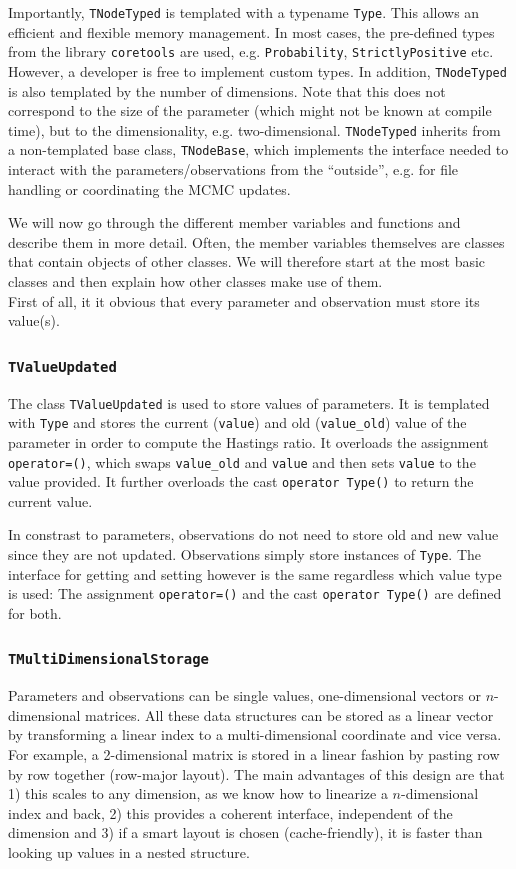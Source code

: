\documentclass[a4paper,11pt]{article}
\def\coretools{\texttt{coretools}}
\newcommand{\class}[1]{\texttt{#1}}
\newcommand{\privparam}[1]{\texttt{\textunderscore #1}}
\newcommand{\pubfunc}[1]{\texttt{#1()}}
\newcommand{\type}[1]{\texttt{#1}}
\begin{document}
Importantly, \class{TNodeTyped} is templated with a typename \type{Type}. This allows an efficient and flexible memory management. In most cases, the pre-defined types from the library \coretools{} are used, e.g. \type{Probability}, \type{StrictlyPositive} etc. However, a developer is free to implement custom types. In addition, \class{TNodeTyped} is also templated by the number of dimensions. Note that this does not correspond to the size of the parameter (which might not be known at compile time), but to the dimensionality, e.g. two-dimensional. \class{TNodeTyped} inherits from a non-templated base class, \class{TNodeBase}, which implements the interface needed to interact with the parameters/observations from the ``outside'', e.g. for file handling or coordinating the MCMC updates.

We will now go through the different member variables and functions and describe them in more detail. Often, the member variables themselves are classes that contain objects of other classes. We will therefore start at the most basic classes and then explain how other classes make use of them.\\
First of all, it it obvious that every parameter and observation must store its value(s).

\subsubsection{\class{TValueUpdated}}
The class \class{TValueUpdated} is used to store values of parameters. It is templated with \type{Type} and stores the current (\privparam{value}) and old (\privparam{value\_old}) value of the parameter in order to compute the Hastings ratio. It overloads the assignment \pubfunc{operator=}, which swaps \privparam{value\_old} and \privparam{value} and then sets \privparam{value} to the value provided. It further overloads the cast \pubfunc{operator Type} to return the current value.

In constrast to parameters, observations do not need to store old and new value since they are not updated. Observations simply store instances of \type{Type}. The interface for getting and setting however is the same regardless which value type is used: The assignment \pubfunc{operator=} and the cast \pubfunc{operator Type} are defined for both.

\subsubsection{\class{TMultiDimensionalStorage}}
Parameters and observations can be single values, one-dimensional vectors or $n$-dimensional matrices. All these data structures can be stored as a linear vector by transforming a linear index to a multi-dimensional coordinate and vice versa. For example, a 2-dimensional matrix is stored in a linear fashion by pasting row by row together (row-major layout). The main advantages of this design are that 1) this scales to any dimension, as we know how to linearize a $n$-dimensional index and back, 2) this provides a coherent interface, independent of the dimension and 3) if a smart layout is chosen (cache-friendly), it is faster than looking up values in a nested structure.
\end{document}
